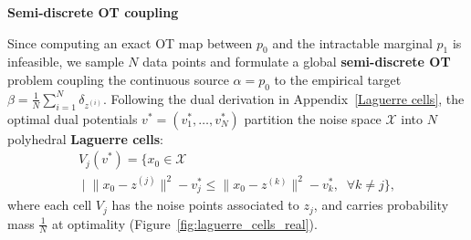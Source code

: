 \textbf{Semi-discrete OT coupling}

Since computing an exact OT map between $p_0$ and the intractable marginal $p_1$ is infeasible, we sample $N$ data points and formulate a global \textbf{semi-discrete OT} problem \cite{peyre2019computational} coupling the continuous source $\alpha = p_0$ to the empirical target $\beta = \frac{1}{N}\sum_{i=1}^N \delta_{z^{(i)}}$. Following the dual derivation in Appendix~\ref{Laguerre cells}, the optimal dual potentials $v^* = (v_1^*, \dots, v_N^*)$ partition the noise space $\mathcal{X}$ into $N$ polyhedral \textbf{Laguerre cells}:
\begin{multline}
    V_j(v^*) = \bigl\{ x_0 \in \mathcal{X} \\
        \;\big|\; \|x_0 - z^{(j)}\|^2 - v_j^* \le \|x_0 - z^{(k)}\|^2 - v_k^*, \;\; \forall k \neq j \bigr\},
\end{multline}
where each cell $V_j$ has the noise points associated to $z_j$, and carries probability mass $\frac{1}{N}$ at optimality (Figure~\ref{fig:laguerre_cells_real}).


